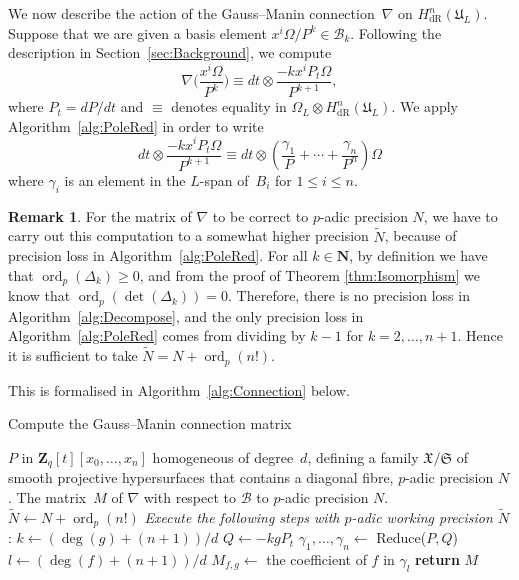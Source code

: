 \documentclass[a4paper,11pt]{article}
\numberwithin{equation}{section}
\newcommand{\NN}{\mathbf{N}} %
\newcommand{\ZZ}{\mathbf{Z}} %
\DeclareMathOperator{\ord}{ord}          %
\providecommand{\HdR}{H_{\text{dR}}}    %
\providecommand{\cB}{\mathcal{B}} %
\theoremstyle{definition}
\newtheorem{rem}[thm]{Remark}
\begin{document}
We now describe the action of the Gauss--Manin connection~$\nabla$ on 
$\HdR^n(\mathfrak{U}_L)$.  Suppose that we are given a basis element 
$x^i \Omega / P^k \in \cB_k$.  Following the description in 
Section~\ref{sec:Background}, we compute
\begin{equation} \label{eqn:nabla}
\nabla \biggl(\frac{x^i \Omega}{P^k}\biggr) \equiv 
dt \otimes \frac{- k x^i P_t \Omega}{P^{k+1}},
\end{equation}
where $P_t = dP/dt$ and $\equiv$ denotes equality in 
$\Omega_{L} \otimes \HdR^n(\mathfrak{U}_L)$. We apply 
Algorithm~\ref{alg:PoleRed} in order to write
\begin{equation}
dt \otimes \frac{- k x^i P_t \Omega}{P^{k+1}} \equiv 
dt \otimes \left( \frac{\gamma_{1}}{P} + \dotsb + \frac{\gamma_n}{P^n} \right) \Omega
\end{equation}
where $\gamma_i$ is an element in the $L$-span of~$B_i$ for $1 \leq i \leq n$. 

\begin{rem} \label{rem:precgm}
For the matrix of $\nabla$ to be correct to $p$-adic precision $N$, we have to 
carry out this computation to a somewhat higher precision $\tilde{N}$, because of 
precision loss in Algorithm~\ref{alg:PoleRed}. 
For all $k \in \NN$, by definition we have that $\ord_p(\Delta_k) \geq 0$, and from the proof
of Theorem \ref{thm:Isomorphism} we know that $\ord_p(\det(\Delta_k))=0$. 
Therefore, there is no precision loss 
in Algorithm~\ref{alg:Decompose}, and the only precision loss in Algorithm~\ref{alg:PoleRed} 
comes from dividing by $k-1$ for $k=2,\ldots,n+1$. Hence it is sufficient to take 
$\tilde{N}=N + \ord_p(n!)$.
\end{rem}

This is formalised in Algorithm~\ref{alg:Connection} below.

\begin{algorithm}
\caption{Compute the Gauss--Manin connection matrix}
\label{alg:Connection}
\begin{algorithmic}
\Require $P$ in $\ZZ_q[t][x_0, \dotsc, x_n]$ homogeneous of degree~$d$, 
         defining a family $\mathfrak{X}/\mathfrak{S}$ of smooth projective 
         hypersurfaces that contains a diagonal fibre, $p$-adic precision $N$.
\Ensure  The matrix~$M$ of $\nabla$ with respect to $\cB$ to $p$-adic precision $N$.
\State $\tilde{N} \gets N + \ord_p(n!)$
\State \textit{Execute the following steps with $p$-adic working precision $\tilde{N}$}:
\State $k \gets  (\deg(g)+(n+1))/d$
\State $Q \gets  - k g P_t$ 
\State $\gamma_{1}, \dotsc, \gamma_n \gets$
      {\sc Reduce($P,Q$)} 
\State $l \gets (\deg(f)+(n+1))/d$
\State $M_{f,g} \gets$ the coefficient of $f$ in $\gamma_l$
\EndFor
\EndFor
\textbf{return} $M$
\EndProcedure
\end{algorithmic}
\end{algorithm}
\end{document}
